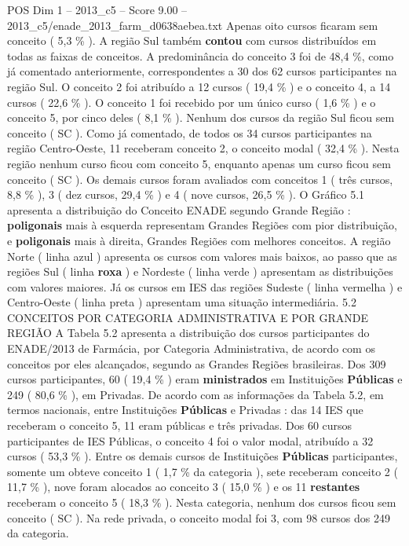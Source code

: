 \begin{textsample}{POS Dim 1 – 2013\_c5 – Score 9.00 – 2013\_c5/enade\_2013\_farm\_d0638aebea.txt}
Apenas oito cursos ficaram sem conceito ( 5,3 \% ).
A região Sul também \textbf{contou} com cursos distribuídos em todas as faixas de conceitos.
A predominância do conceito 3 foi de 48,4 \%, como já comentado anteriormente, correspondentes a 30 dos 62 cursos participantes na região Sul.
O conceito 2 foi atribuído a 12 cursos ( 19,4 \% ) e o conceito 4, a 14 cursos ( 22,6 \% ).
O conceito 1 foi recebido por um único curso ( 1,6 \% ) e o conceito 5, por cinco deles ( 8,1 \% ).
Nenhum dos cursos da região Sul ficou sem conceito ( SC ).
Como já comentado, de todos os 34 cursos participantes na região Centro-Oeste, 11 receberam conceito 2, o conceito modal ( 32,4 \% ).
Nesta região nenhum curso ficou com conceito 5, enquanto apenas um curso ficou sem conceito ( SC ).
Os demais cursos foram avaliados com conceitos 1 ( três cursos, 8,8 \% ), 3 ( dez cursos, 29,4 \% ) e 4 ( nove cursos, 26,5 \% ).
O Gráfico 5.1 apresenta a distribuição do Conceito ENADE segundo Grande Região : \textbf{poligonais} mais à esquerda representam Grandes Regiões com pior distribuição, e \textbf{poligonais} mais à direita, Grandes Regiões com melhores conceitos.
A região Norte ( linha azul ) apresenta os cursos com valores mais baixos, ao passo que as regiões Sul ( linha \textbf{roxa} ) e Nordeste ( linha verde ) apresentam as distribuições com valores maiores.
Já os cursos em IES das regiões Sudeste ( linha vermelha ) e Centro-Oeste ( linha preta ) apresentam uma situação intermediária. 5.2 CONCEITOS POR CATEGORIA ADMINISTRATIVA E POR GRANDE REGIÃO A Tabela 5.2 apresenta a distribuição dos cursos participantes do ENADE/2013 de Farmácia, por Categoria Administrativa, de acordo com os conceitos por eles alcançados, segundo as Grandes Regiões brasileiras.
Dos 309 cursos participantes, 60 ( 19,4 \% ) eram \textbf{ministrados} em Instituições \textbf{Públicas} e 249 ( 80,6 \% ), em Privadas.
De acordo com as informações da Tabela 5.2, em termos nacionais, entre Instituições \textbf{Públicas} e Privadas : das 14 IES que receberam o conceito 5, 11 eram públicas e três privadas.
Dos 60 cursos participantes de IES Públicas, o conceito 4 foi o valor modal, atribuído a 32 cursos ( 53,3 \% ).
Entre os demais cursos de Instituições \textbf{Públicas} participantes, somente um obteve conceito 1 ( 1,7 \% da categoria ), sete receberam conceito 2 ( 11,7 \% ), nove foram alocados ao conceito 3 ( 15,0 \% ) e os 11 \textbf{restantes} receberam o conceito 5 ( 18,3 \% ).
Nesta categoria, nenhum dos cursos ficou sem conceito ( SC ).
Na rede privada, o conceito modal foi 3, com 98 cursos dos 249 da categoria.

\end{textsample}
